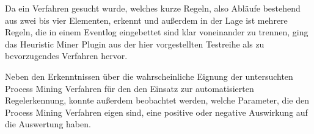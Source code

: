 \begin{table}[!htbp]
\centering
{}
\caption{Ergebnisse der Auswertung der Versuchsreihe}
\label{tab:results_short}
\end{table}

Da ein Verfahren gesucht wurde, welches kurze Regeln, also Abläufe bestehend aus zwei bis vier Elementen, erkennt und außerdem in der Lage ist mehrere Regeln, die in einem Eventlog eingebettet sind klar voneinander zu trennen, ging das Heuristic Miner Plugin aus der hier vorgestellten Testreihe als zu bevorzugendes Verfahren hervor.

Neben den Erkenntnissen über die wahrscheinliche Eignung der untersuchten Process Mining Verfahren für den den Einsatz zur automatisierten Regelerkennung, konnte außerdem beobachtet werden, welche Parameter, die den Process Mining Verfahren eigen sind, eine positive oder negative Auswirkung auf die Auswertung haben. 

